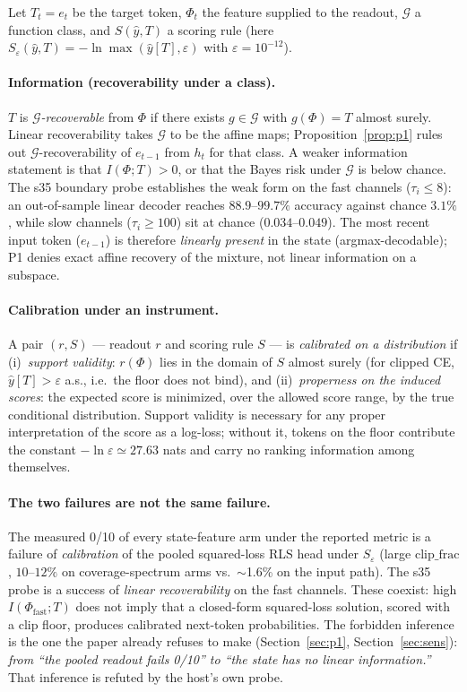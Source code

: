 \documentclass[preprint,12pt]{elsarticle}
\begin{document}
Let $T_t=e_t$ be the target token, $\Phi_t$ the feature supplied to
the readout, $\mathcal{G}$ a function class, and $S(\hat y, T)$ a
scoring rule (here $S_\varepsilon(\hat y,T)=-\ln\max(\hat y[T],\varepsilon)$
with $\varepsilon=10^{-12}$).

\paragraph{Information (recoverability under a class).}
$T$ is \emph{$\mathcal{G}$-recoverable} from $\Phi$ if there exists
$g\in\mathcal{G}$ with $g(\Phi)=T$ almost surely. Linear recoverability
takes $\mathcal{G}$ to be the affine maps; Proposition~\ref{prop:p1}
rules out $\mathcal{G}$-recoverability of $e_{t-1}$ from $h_t$ for
that class. A weaker information statement is that $I(\Phi;T)>0$, or
that the Bayes risk under $\mathcal{G}$ is below chance. The s35
boundary probe establishes the weak form on the fast channels
($\tau_i\le 8$): an out-of-sample linear decoder reaches
$88.9$--$99.7\%$ accuracy against chance $3.1\%$, while slow channels
($\tau_i\ge 100$) sit at chance ($0.034$--$0.049$). The most recent
input token ($e_{t-1}$)
is therefore \emph{linearly present} in the state (argmax-decodable); P1
denies exact
affine recovery of the mixture, not linear information on a subspace.

\paragraph{Calibration under an instrument.}
A pair $(r,S)$ --- readout $r$ and scoring rule $S$ --- is
\emph{calibrated on a distribution} if (i)~\emph{support validity}:
$r(\Phi)$ lies in the domain of $S$ almost surely (for clipped CE,
$\hat y[T]>\varepsilon$ a.s., i.e.\ the floor does not bind), and
(ii)~\emph{properness on the induced scores}: the expected score is
minimized, over the allowed score range, by the true conditional
distribution. Support validity is necessary for any proper
interpretation of the score as a log-loss; without it, tokens on the
floor contribute the constant $-\ln\varepsilon\simeq 27.63$ nats and
carry no ranking information among themselves.

\paragraph{The two failures are not the same failure.}
The measured 0/10 of every state-feature arm under the reported metric
is a failure of \emph{calibration} of the pooled squared-loss RLS head
under $S_\varepsilon$ (large $\mathrm{clip\_frac}$, $10$--$12\%$ on
coverage-spectrum arms vs.\ $\sim$1.6\% on the input path). The s35
probe is a success of \emph{linear recoverability} on the fast
channels. These coexist: high $I(\Phi_{\mathrm{fast}}; T)$ does not
imply that a closed-form squared-loss solution, scored with a clip
floor, produces calibrated next-token probabilities. The forbidden
inference is the one the paper already refuses to make
(Section~\ref{sec:p1}, Section~\ref{sec:sens}):
\emph{from ``the pooled readout fails 0/10'' to ``the state has no
linear information.''} That inference is refuted by the host's own
probe.
\end{document}
